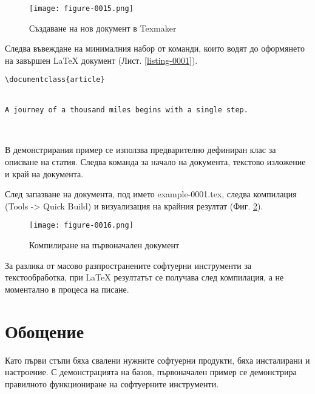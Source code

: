 \begin{figure}
  \centering
  \texttt{[image: figure-0015.png]}
  \caption{Създаване на нов документ в Texmaker}
\label{figure-0015}
\end{figure}

Следва въвеждане на минималния набор от команди, които водят до оформянето на завършен LaTeX документ (Лист. \ref{listing-0001}).

\begin{lstlisting}[language={[LaTeX]TeX}, caption=Минимален шаблон за LaTeX документ, label=listing-0001]
\documentclass{article}


A journey of a thousand miles begins with a single step.



\end{lstlisting}

В демонстрирания пример се използва предварително дефиниран клас за описване на статия. Следва команда за начало на документа, текстово изложение и край на документа.

След запазване на документа, под името example-0001.tex, следва компилация (Tools -> Quick Build) и  визуализация на крайния резултат (Фиг. \ref{figure-0016}).

\begin{figure}
  \centering
  \texttt{[image: figure-0016.png]}
  \caption{Компилиране на първоначален документ}
\label{figure-0016}
\end{figure}

За разлика от масово разпространените софтуерни инструменти за текстообработка, при LaTeX резултатът се получава след компилация, а не моментално в процеса на писане.

\section*{Обощение}

Като първи стъпи бяха свалени нужните софтуерни продукти, бяха инсталирани и настроение. С демонстрацията на базов, първоначален пример се демонстрира правилното функциониране на софтуерните инструменти.

